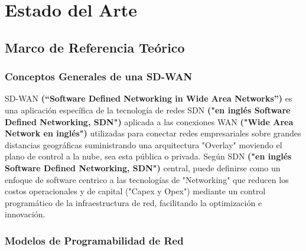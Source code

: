 
\chapter{Estado del Arte}
\label{cha:Estado del Arte}

\section{Marco de Referencia Teórico} %
\label{sec:Marco de Referencia Teórico}

\subsection{Conceptos Generales de una SD-WAN}
\label{sec:Conceptos Generales de una SD-WAN}
SD-WAN  \textbf{(“Software Defined Networking in Wide Area Networks”)} es una aplicación específica de la tecnología de redes SDN \textbf{("en inglés Software Defined Networking, SDN")} aplicada a las conexiones WAN  \textbf{("Wide Area Network en inglés")} utilizadas para conectar redes empresariales sobre grandes distancias geográficas suministrando una arquitectura "Overlay" moviendo el plano de control a la nube, sea esta pública o privada. Según SDN  \textbf{("en inglés Software Defined Networking, SDN")} central, puede definirse como un enfoque de software centrico a las tecnologías de "Networking" que reducen los costos operacionales y de capital ("Capex y Opex") mediante un control programático de la infraestructura de red, facilitando la optimización e innovación.
\\
\subsection{Modelos de Programabilidad de Red}
\label{sec:Modelos de Programabilidad de Red}

